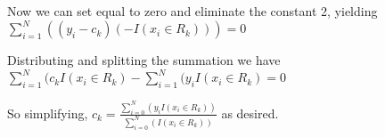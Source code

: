 \documentclass[11pt]{article}
\begin{document}
\vspace{3 mm}
\noindent
Now we can set equal to zero and eliminate the constant 2, yielding $\sum\limits_{i=1}^N ((y_{i} - c_{k})(-I(x_{i} \in R_{k}))) = 0$

\vspace{3 mm}
\noindent
Distributing and splitting the summation we have $\sum\limits_{i=1}^N (c_{k}I(x_{i} \in R_{k}) - \sum\limits_{i=1}^N (y_{i}I(x_{i} \in R_{k}) = 0$

\vspace{3 mm}
\noindent
So simplifying, ${c}_{k} = \frac{\sum\limits_{i=0}^N (y_{i} I(x_{i} \in R_{k}))}{\sum\limits_{i=0}^N (I(x_{i} \in R_{k}))}$ as desired.
\end{document}
